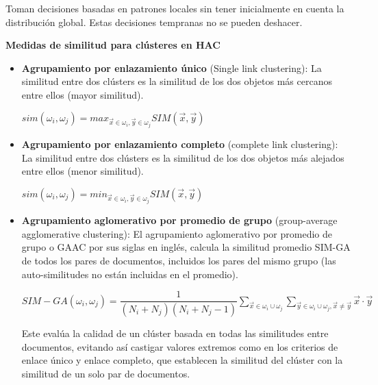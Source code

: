 \documentclass{llncs}
\begin{document}
Toman decisiones basadas en patrones locales sin tener inicialmente en cuenta la distribución global. Estas decisiones tempranas no se pueden deshacer.

\vspace{1em}
\textbf{Medidas de similitud para cl\'usteres en HAC}

\begin{itemize}
	\item \textbf{Agrupamiento por enlazamiento \'unico} (Single link clustering): La similitud entre dos cl\'usters es la similitud de los dos objetos más cercanos entre ellos (mayor similitud).
	
	\begin{center}
		$ sim(\omega_{i}, \omega_{j}) = max_{\overrightarrow{x} \in \omega_{i}, \overrightarrow{y} \in \omega_{j}} SIM(\overrightarrow{x}, \overrightarrow{y})$
	\end{center}
	
	\vspace{1em}
	\item \textbf{Agrupamiento por enlazamiento completo} (complete link clustering): La similitud entre dos cl\'usters es la similitud de los dos objetos más alejados entre ellos (menor similitud). 
	
	\begin{center}
		$ sim(\omega_{i}, \omega_{j}) = min_{\overrightarrow{x} \in \omega_{i}, \overrightarrow{y} \in \omega_{j}} SIM(\overrightarrow{x}, \overrightarrow{y})$
	\end{center}
	
	\vspace{1em}
	\item \textbf{Agrupamiento aglomerativo por promedio de grupo} (group-average agglomerative clustering): El agrupamiento aglomerativo por promedio de grupo o GAAC por sus siglas en ingl\'es, calcula la similitud promedio SIM-GA de todos los pares de documentos, incluidos los pares del mismo grupo (las auto-similitudes no están incluidas en el promedio).
	
	\begin{center}
	\footnotesize
	$ SIM-GA(\omega_{i}, \omega_{j}) = \dfrac{1}{(N_{i} + N_{j})(N_{i} + N_{j} - 1)} \sum_{\overrightarrow{x} \in \omega_{i} \cup \omega_{j}} \sum_{\overrightarrow{y} \in \omega_{i} \cup \omega_{j}, \overrightarrow{x} \neq \overrightarrow{y}} \overrightarrow{x} \cdot \overrightarrow{y} $
	\end{center}
	
	Este evalúa la calidad de un clúster basada en todas las similitudes entre documentos, evitando así castigar valores extremos como en los criterios de enlace único y enlace completo, que establecen la similitud del cl\'uster con la similitud de un solo par de documentos.
	

\end{itemize}
\end{document}
